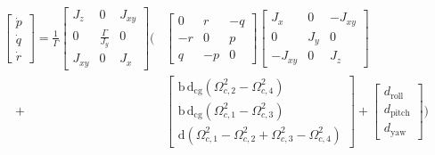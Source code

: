 \documentclass[3p]{elsarticle}
\begin{document}
\begin{equation}
    \begin{aligned}
        \begin{bmatrix}
            \dot{p} \\
            \dot{q} \\
            \dot{r}
        \end{bmatrix} = \frac{1}{\Gamma} \begin{bmatrix}
            J_z & 0 & J_{xy} \\
            0 & \frac{\Gamma}{J_y} & 0 \\
            J_{xy} & 0 & J_x
        \end{bmatrix} \Bigg(
        &\begin{bmatrix}
            0 & r & -q \\
            -r & 0 & p \\
            q & -p & 0
        \end{bmatrix} \begin{bmatrix}
            J_x & 0 & -J_{xy} \\
            0 & J_y & 0 \\
            -J_{xy} & 0 & J_z
        \end{bmatrix} \\
        \quad+ &\begin{bmatrix}
            \mathrm{b\,d}_{\text{cg}} (\Omega_{c, 2}^2 - \Omega_{c, 4}^2) \\
            \mathrm{b\,d}_{\text{cg}} (\Omega_{c, 1}^2 - \Omega_{c, 3}^2) \\
            \mathrm{d} (\Omega_{c, 1}^2 - \Omega_{c, 2}^2 + \Omega_{c, 3}^2 - \Omega_{c, 4}^2)
        \end{bmatrix} + \begin{bmatrix}
            d_{\text{roll}} \\
            d_{\text{pitch}} \\
            d_{\text{yaw}}
        \end{bmatrix}
        \Bigg)
    \end{aligned}
\end{equation}

    
\end{document}
